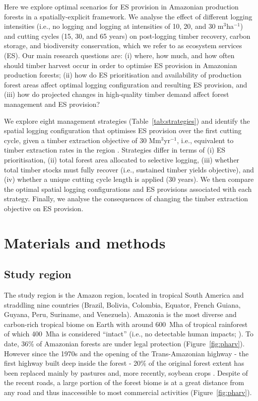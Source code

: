 \documentclass[12pt]{article}
\begin{document}
Here we explore optimal scenarios for ES provision in Amazonian production forests in a spatially-explicit framework. We analyse the effect of different logging intensities (i.e., no logging and logging at intensities of 10, 20, and 30 m$^3$ha$^{-1}$) and cutting cycles (15, 30, and 65 years) on post-logging timber recovery, carbon storage, and biodiversity conservation, which we refer to as ecosystem services (ES). Our main research questions are: (i) where, how much, and how often should timber harvest occur in order to optimise ES provision in Amazonian production forests; (ii) how do ES prioritisation and availability of production forest areas affect optimal logging configuration and resulting ES provision, and (iii) how do projected changes in high-quality timber demand affect forest management and ES provision? 

We explore eight management strategies (Table~\ref{tab:strategies}) and identify the spatial logging configuration that optimises ES provision over the first cutting cycle, given a timber extraction objective of 30 Mm$^3$yr$^{-1}$, i.e., equivalent to timber extraction rates in the region \cite{Lentini2005}. Strategies differ in terms of (i) ES prioritisation, (ii) total forest area allocated to selective logging, (iii) whether total timber stocks must fully recover (i.e., sustained timber yields objective), and (iv) whether a unique cutting cycle length is applied (30 years). We then compare the optimal spatial logging configurations and ES provisions associated with each strategy. Finally, we analyse the consequences of changing the timber extraction objective on ES provision.

\section*{Materials and methods}

\subsection*{Study region}

The study region is the Amazon region, located in tropical South America and straddling nine countries (Brazil, Bolivia, Colombia, Equator, French Guiana, Guyana, Peru, Suriname, and Venezuela). Amazonia is the most diverse and carbon-rich tropical biome on Earth \cite{Avitabile2016,Pimm2014} with around 600~Mha of tropical rainforest of which 400~Mha is considered “intact” (i.e., no detectable human impacts; \cite{Potapov2017}). To date, 36\% of Amazonian forests are under legal protection \cite{WDPA2016} (Figure~\ref{fig:pharv}). However since the 1970s and the opening of the Trans-Amazonian highway - the first highway built deep inside the forest - 20\% of the original forest extent has been replaced mainly by pastures and, more recently, soybean crops \cite{Kalamandeen2018,Fearnside2017}. Despite of the recent roads, a large portion of the forest biome is at a great distance from any road and thus inaccessible to most commercial activities (Figure~\ref{fig:pharv}).
\end{document}
